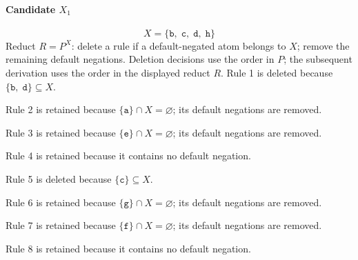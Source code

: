 \documentclass[a4paper,11pt]{article}
\newcommand{\at}[1]{\texttt{#1}}
\begin{document}
\paragraph{Candidate $X_1$}
\[
X=\{\at{b},\;\at{c},\;\at{d},\;\at{h}\}
\]
Reduct $R=P^X$: delete a rule if a default-negated atom belongs to $X$; remove the remaining default negations. Deletion decisions use the order in $P$; the subsequent derivation uses the order in the displayed reduct $R$.
Rule 1 is deleted because $\{\at{b},\;\at{d}\}\subseteq X$.

Rule 2 is retained because $\{\at{a}\}\cap X=\varnothing$; its default negations are removed.

Rule 3 is retained because $\{\at{e}\}\cap X=\varnothing$; its default negations are removed.

Rule 4 is retained because it contains no default negation.

Rule 5 is deleted because $\{\at{c}\}\subseteq X$.

Rule 6 is retained because $\{\at{g}\}\cap X=\varnothing$; its default negations are removed.

Rule 7 is retained because $\{\at{f}\}\cap X=\varnothing$; its default negations are removed.

Rule 8 is retained because it contains no default negation.
\end{document}
